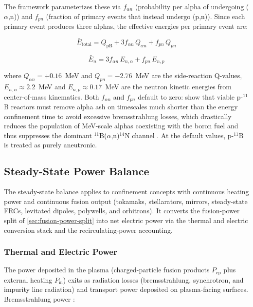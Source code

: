 \documentclass{article}
\begin{document}
The framework parameterizes these via $f_{\alpha n}$ (probability per
alpha of undergoing ($\alpha$,n)) and $f_{pn}$ (fraction of primary
events that instead undergo (p,n)). Since each primary event produces
three alphas, the effective energies per primary event are:

\begin{equation}
\label{eq:pb11-etotal}
\bar{E}_{\text{total}} = Q_{\text{pB}} + 3 f_{\alpha n} \, Q_{\alpha n}
  + f_{pn} \, Q_{pn}
\end{equation}

\begin{equation}
\label{eq:pb11-eneutron}
\bar{E}_n = 3 f_{\alpha n} \, E_{n,\alpha} + f_{pn} \, E_{n,p}
\end{equation}

\noindent where $Q_{\alpha n} = +0.16$~MeV and $Q_{pn} = -2.76$~MeV
are the side-reaction Q-values, $E_{n,\alpha} \approx 2.2$~MeV and
$E_{n,p} \approx 0.17$~MeV are the neutron kinetic energies from
center-of-mass kinematics.
Both $f_{\alpha n}$ and $f_{pn}$ default to zero:
\citet{ochs2025} show that viable p-${}^{11}$B reactors must remove
alpha ash on timescales much shorter than the energy confinement time
to avoid excessive bremsstrahlung losses, which drastically reduces the
population of MeV-scale alphas coexisting with the boron fuel and thus
suppresses the dominant ${}^{11}$B($\alpha$,n)${}^{14}$N channel
\citep{hora2021}. At the default values, p-${}^{11}$B is treated as
purely aneutronic.

\subsection{Steady-State Power Balance}
\label{sec:steady-balance}

The steady-state balance applies to confinement concepts with
continuous heating power and continuous fusion output (tokamaks,
stellarators, mirrors, steady-state FRCs, levitated dipoles, polywells,
and orbitrons). It converts the fusion-power split of
\cref{sec:fusion-power-split} into net electric power via the thermal
and electric conversion stack and the recirculating-power accounting.

\subsubsection{Thermal and Electric Power}

The power deposited in the plasma (charged-particle fusion products
$P_{\text{cp}}$ plus external heating $P_{\text{in}}$) exits as
radiation losses (bremsstrahlung, synchrotron, and impurity line
radiation) and transport power deposited on plasma-facing surfaces.
Bremsstrahlung power \citep{wesson2011}:
\end{document}
